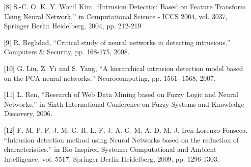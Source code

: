 \documentclass[
	12pt,				%
	openright,			%
	oneside,
	a4paper,			%
	english,			%
	french,				%
	spanish,			%
	brazil				%
	]{abntex2}
\begin{document}
[8] S.-C. O. K. Y. Wonil Kim, “Intrusion
Detection Based on Feature Transform Using
Neural Network,” in Computational Science -
ICCS 2004, vol. 3037, Springer Berlin
Heidelberg, 2004, pp. 212-219

[9] R. Beghdad, “Critical study of neural networks in detecting intrusions,” Computers \& Security, pp. 168-175, 2008.

[10] G. Liu, Z. Yi and S. Yang, “A hierarchical
intrusion detection model based on the PCA
neural networks,” Neurocomputing, pp. 1561-
1568, 2007.

[11] L. Ren, “Research of Web Data Mining based
on Fuzzy Logic and Neural Networks,” in
Sixth International Conference on Fuzzy
Systems and Knowledge Discovery, 2006.

[12] F. M.-P. F. J. M.-G. R. L.-F. J. A. G.-M.-A.
D. M.-J. Iren Lorenzo-Fonseca, “Intrusion
detection method using Neural Networks
based on the reduction of characteristics,” in
Bio-Inspired Systems: Computational and
Ambient Intelligence, vol. 5517, Springer
Berlin Heidelberg, 2009, pp. 1296-1303.
\end{document}
